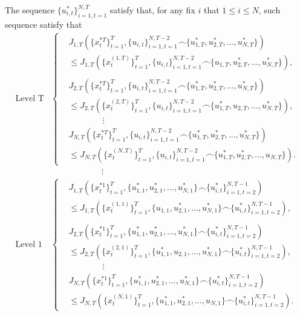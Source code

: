 \documentclass{article}
\begin{document}
The sequence $\{ u_{i,t}^{*}\}_{i=1,t=1}^{N,T}$ satisfy that, for any fix $i$ that $1 \leq i \leq N$, such 
sequence satisfy that 
\begin{equation}\label{eq:nashIneq}
    \begin{split}
        \text{Level T}
        &\begin{cases}
            &J_{1,T}(\{x_{t}^{*T}\}_{t=1}^{T}, \{u_{i,t}\}_{i=1,t=1}^{N,T-2} \frown \{u_{1,T}^{*},u_{2,T}^{*},\dots,u_{N,T}^{*}\}) \\ & \leq J_{1,T}(\{x_{t}^{(1,T)}\}_{t=1}^{T}, \{u_{i,t}\}_{i=1,t=1}^{N,T-2} \frown \{u_{1,T},u_{2,T}^{*},\dots,u_{N,T}^{*}\}),\\ \\
            &J_{2,T}(\{x_{t}^{*T}\}_{t=1}^{T}, \{u_{i,t}\}_{i=1,t=1}^{N,T-2} \frown \{u_{1,T}^{*},u_{2,T}^{*},\dots,u_{N,T}^{*}\}) \\ & \leq J_{2,T}(\{x_{t}^{(2,T)}\}_{t=1}^{T}, \{u_{i,t}\}_{i=1,t=1}^{N,T-2} \frown \{u_{1,T}^{*},u_{2,T},\dots,u_{N,T}^{*}\}),\\
            & \qquad \qquad \vdots \\
            &J_{N,T}(\{x_{t}^{*T}\}_{t=1}^{T}, \{u_{i,t}\}_{i=1,t=1}^{N,T-2} \frown \{u_{1,T}^{*},u_{2,T}^{*},\dots,u_{N,T}^{*}\}) \\ & \leq J_{N,T}(\{x_{t}^{(N,T)}\}_{t=1}^{T}, \{u_{i,t}\}_{i=1,t=1}^{N,T-2} \frown \{u_{1,T}^{*},u_{2,T}^{*},\dots,u_{N,T}\}).
        \end{cases}
    \\ &\qquad \qquad \qquad \vdots \\
    \text{Level 1}
        &\begin{cases}
            &J_{1,T}(\{x_{t}^{*1}\}_{t=1}^{T}, \{u_{1,1}^{*},u_{2,1}^{*},\dots,u_{N,1}^{*}\} \frown \{u_{i,t}^{*}\}_{i=1,t=2}^{N,T-1}) \\ & \leq J_{1,T}(\{x_{t}^{(1,1)}\}_{t=1}^{T}, \{u_{1,1},u_{2,1}^{*},\dots,u_{N,1}^{*}\} \frown \{u_{i,t}^{*}\}_{i=1,t=2}^{N,T-1}),\\ \\
            &J_{2,T}(\{x_{t}^{*1}\}_{t=1}^{T}, \{u_{1,1}^{*},u_{2,1}^{*},\dots,u_{N,1}^{*}\} \frown \{u_{i,t}^{*}\}_{i=1,t=2}^{N,T-1}) \\ & \leq J_{2,T}(\{x_{t}^{(2,1)}\}_{t=1}^{T}, \{u_{1,1}^{*},u_{2,1},\dots,u_{N,1}^{*}\} \frown \{u_{i,t}^{*}\}_{i=1,t=2}^{N,T-1}),\\
            & \qquad \qquad \vdots \\
            &J_{N,T}(\{x_{t}^{*1}\}_{t=1}^{T}, \{u_{1,1}^{*},u_{2,1}^{*},\dots,u_{N,1}^{*}\} \frown \{u_{i,t}^{*}\}_{i=1,t=2}^{N,T-1}) \\ & \leq J_{N,T}(\{x_{t}^{(N,1)}\}_{t=1}^{T}, \{u_{1,1}^{*},u_{2,1}^{*},\dots,u_{N,1}\} \frown \{u_{i,t}^{*}\}_{i=1,t=2}^{N,T-1}).
        \end{cases}
    \end{split}
\end{equation}
\end{document}
